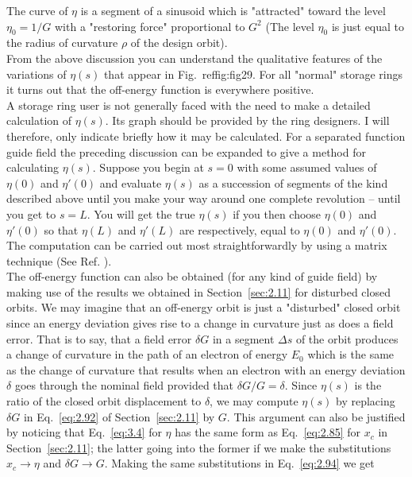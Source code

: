 The curve of $\eta$ is a segment of a sinusoid which is "attracted" toward the level
$\eta_0 = 1/G$ with a "restoring force" proportional to $G^2$ (The level $\eta_0$ is just equal
to the radius of curvature $\rho$ of the design orbit).\\
From the above discussion you can understand the qualitative features of the variations
 of $\eta(s)$ that appear in Fig.~ref{fig:fig29}. For all "normal" storage rings it turns
out that the off-energy function is everywhere positive.\\
A storage ring user is not generally faced with the need to make a detailed calculation of $\eta(s)$. Its graph should be provided by the ring designers. I will therefore, only indicate briefly how it may be calculated. For a separated function guide field the preceding discussion can be expanded to give a method for calculating $\eta(s)$. Suppose you begin at $s = 0$ with some assumed values of $\eta(0)$ and $\eta'(0)$ and evaluate $\eta(s)$ as a succession of segments of the kind described above until you make your way around one complete revolution -- until you get to $s = L$. You will get the true $\eta(s)$ if you then choose $\eta(0)$ and $\eta'(0)$ so that $\eta(L)$ and $\eta'(L)$ are respectively, equal to $\eta(0)$ and $\eta'(0)$. The computation can be carried out most straightforwardly by using a matrix technique (See Ref. \cite{11}).\\
The off-energy function can also be obtained (for any kind of guide field) by making use of the results we obtained in Section~\ref{sec:2.11} for disturbed closed orbits. We may imagine that an off-energy orbit is just a "disturbed" closed orbit since an energy deviation gives rise to a change in curvature just as does a field error. That is to say, that a field error $\delta G$ in a segment $\Delta s$ of the orbit produces a change of curvature in the path of an electron of energy $E_0$ which is the same as the change of curvature that results when an electron with an energy deviation $\delta$ goes through the nominal field provided that $\delta G/G = \delta$. Since $\eta(s)$ is the ratio of the closed orbit displacement to $\delta$, we may compute $\eta(s)$ by replacing $\delta G$ in Eq.~\eqref{eq:2.92} of Section~\ref{sec:2.11} by $G$. This argument can also be justified by noticing that Eq.~\eqref{eq:3.4} for $\eta$ has the same form as Eq.~\eqref{eq:2.85} for $x_c$ in Section~\ref{sec:2.11}; the latter going into the former
 if we make the substitutions $x_c \to \eta$ and $\delta G \to G$. Making the same substitutions
 in Eq.~\eqref{eq:2.94} we get
